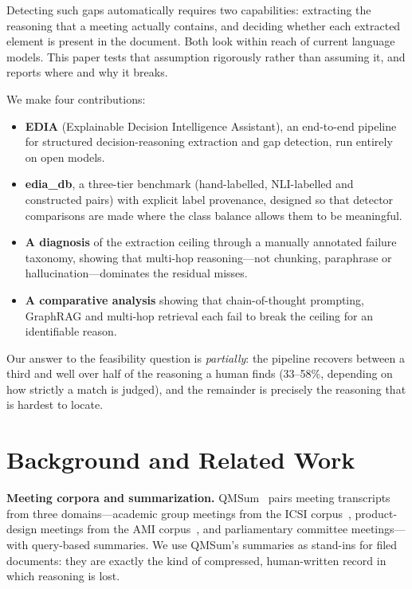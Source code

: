 \documentclass[conference]{IEEEtran}
\newcommand{\EDIAfull}{Explainable Decision Intelligence Assistant}
\begin{document}
Detecting such gaps automatically requires two capabilities: extracting the
reasoning that a meeting actually contains, and deciding whether each extracted
element is present in the document. Both look within reach of current language
models. This paper tests that assumption rigorously rather than assuming it, and
reports where and why it breaks.

We make four contributions:
\begin{itemize}
\item \textbf{EDIA} (\EDIAfull), an end-to-end pipeline for structured decision-reasoning
extraction and gap detection, run entirely on open models.
\item \textbf{edia\_db}, a three-tier benchmark (hand-labelled, NLI-labelled and
constructed pairs) with explicit label provenance, designed so that detector
comparisons are made where the class balance allows them to be meaningful.
\item \textbf{A diagnosis} of the extraction ceiling through a manually
annotated failure taxonomy, showing that multi-hop reasoning---not chunking,
paraphrase or hallucination---dominates the residual misses.
\item \textbf{A comparative analysis} showing that chain-of-thought prompting,
GraphRAG and multi-hop retrieval each fail to break the ceiling for an
identifiable reason.
\end{itemize}

Our answer to the feasibility question is \emph{partially}: the pipeline recovers
between a third and well over half of the reasoning a human finds (33--58\%,
depending on how strictly a match is judged), and the remainder is precisely the
reasoning that is hardest to locate.

\section{Background and Related Work}

\textbf{Meeting corpora and summarization.} QMSum~\cite{zhong2021qmsum} pairs
meeting transcripts from three domains---academic group meetings from the ICSI
corpus~\cite{janin2003icsi}, product-design meetings from the AMI
corpus~\cite{carletta2005ami}, and parliamentary committee meetings---with
query-based summaries. We use QMSum's summaries as stand-ins for filed documents:
they are exactly the kind of compressed, human-written record in which
reasoning is lost.
\end{document}
